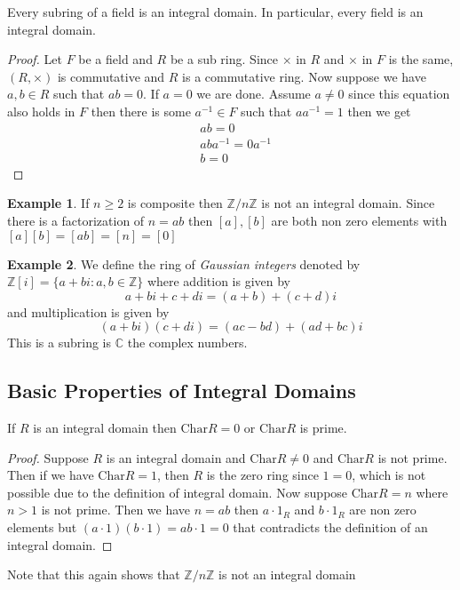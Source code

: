 \documentclass[16pt,a4paper]{article}
\theoremstyle{definition}
\newtheorem{example}{Example}
\begin{document}
\newpage
\begin{thm}{}{}
Every subring of a field is an integral domain. In particular, every field is an integral
domain.
\end{thm}
\begin{proof}
Let $F$ be a field and $R$ be a sub ring. Since $\times$ in $R$ and $\times$ in $F$ is the same, $(R,\times)$ is commutative and $R$ is a commutative ring. Now suppose we have $a,b\in R$ such that $ab=0$. If $a=0$ we are done. Assume $a\neq 0$ since this equation also holds in $F$ then there is some $a^{-1}\in F$ such that $aa^{-1}=1$ then we get 
\begin{align*}
&ab=0\\
&aba^{-1}=0a^{-1}\\
&b=0
\end{align*}
\end{proof}

\begin{example}
If $n\geq 2$ is composite then $\mathbb{Z}/n\mathbb{Z}$ is not an integral domain. Since there is a factorization of $n=ab$ then $[a],[b]$ are both non zero elements with $[a][b]=[ab]=[n]=[0]$
\end{example}


\begin{example}
We define the ring of \emph{Gaussian integers} denoted by $\mathbb{Z}[i]=\{a+bi : a,b\in \mathbb{Z}\}$ where addition is given by 
\[a+bi+c+di = (a+b)+(c+d)i\]
and multiplication is given by 
\[(a+bi)(c+di) = (ac-bd)+(ad+bc)i\]
This is a subring is $\mathbb{C}$ the complex numbers. 
\end{example}

\subsection{Basic Properties of Integral Domains}

\begin{thm}{}{}
If $R$ is an integral domain then $\mathrm{Char} R = 0$ or $\mathrm{Char} R$ is prime. 
\end{thm}
\begin{proof}
Suppose $R$ is an integral domain and $\mathrm{Char}R\neq 0$ and $\mathrm{Char}R$ is not prime. Then if we have $\mathrm{Char} R=1$, then $R$ is the zero ring since $1=0$, which is not possible due to the definition of integral domain. Now suppose $\mathrm{Char}R=n$ where $n>1$ is not prime. Then we have $n=ab$ then $a\cdot 1_R$ and $b\cdot 1_R$ are non zero elements but $(a\cdot 1)(b\cdot 1) = ab\cdot 1 =0$ that contradicts the definition of an integral domain. 
\end{proof}
Note that this again shows that $\mathbb{Z}/n\mathbb{Z}$ is not an integral domain
\end{document}
